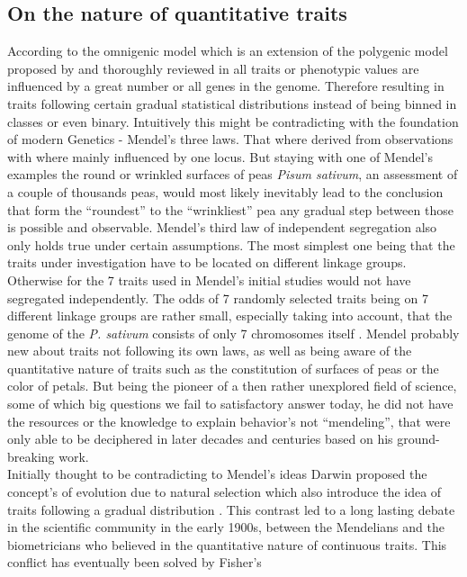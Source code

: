 \subsection{On the nature of quantitative traits} \label{quan} According to the omnigenic model which is an extension of
the polygenic model proposed by \cite{boyle2017expanded} and thoroughly reviewed in \cite{timpson2018} all traits or
phenotypic values are influenced by a great number or all genes in the genome. Therefore resulting in traits following
certain gradual statistical distributions instead of being binned in classes or even binary. Intuitively this might be
contradicting with the foundation of modern Genetics - Mendel's three laws. That where derived from observations with
where mainly influenced by one locus. But staying with one of Mendel's examples the round or wrinkled surfaces of peas
\textit{Pisum sativum}, an assessment of a couple of thousands peas, would most likely inevitably lead to the conclusion
that form the ``roundest'' to the ``wrinkliest'' pea any gradual step between those is possible and observable. Mendel's
third law of independent segregation also only holds true under certain assumptions. The most simplest one being that
the traits under investigation have to be located on different linkage groups. Otherwise for the 7 traits used in
Mendel's initial studies would not have segregated independently. The odds of 7 randomly selected traits being on 7
different linkage groups are rather small, especially taking into account, that the genome of the \textit{P. sativum}
consists of only 7 chromosomes itself \cite{kalo2004}. Mendel probably new about traits not following its own laws, as
well as being aware of the quantitative nature of traits such as the constitution of surfaces of peas or the color of
petals. But being the pioneer of a then rather unexplored field of science, some of which big questions we fail to
satisfactory answer today, he did not have the resources or the knowledge to explain behavior's not ``mendeling'', that
were only able to be deciphered in later decades and centuries
based on his ground-breaking work. \\
Initially thought to be contradicting to Mendel's ideas Darwin proposed the concept's of evolution due to natural
selection which also introduce the idea of traits following a gradual distribution \cite{darwin1859}. This contrast led
to a long lasting debate in the scientific community in the early 1900s, between the Mendelians and the biometricians
who believed in the quantitative nature of continuous traits. This conflict has eventually been solved by Fisher's
